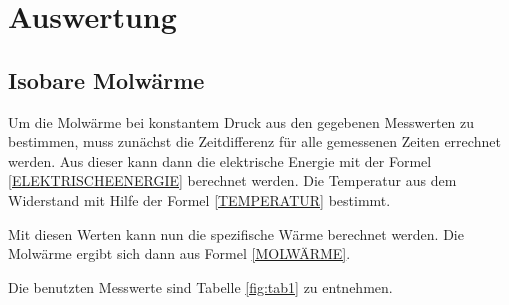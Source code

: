\section{Auswertung}
\subsection{Isobare Molwärme}
Um die Molwärme bei konstantem Druck aus den gegebenen Messwerten zu bestimmen, muss zunächst die Zeitdifferenz für alle gemessenen Zeiten errechnet werden. Aus dieser kann dann die elektrische Energie mit der Formel \ref{ELEKTRISCHEENERGIE} berechnet werden. Die Temperatur aus dem Widerstand mit Hilfe der Formel \ref{TEMPERATUR} bestimmt.

\noincent Mit diesen Werten kann nun die spezifische Wärme berechnet werden. Die Molwärme ergibt sich dann aus Formel \ref{MOLWÄRME}.

\noindent Die benutzten Messwerte sind Tabelle \ref{fig:tab1} zu entnehmen.   

